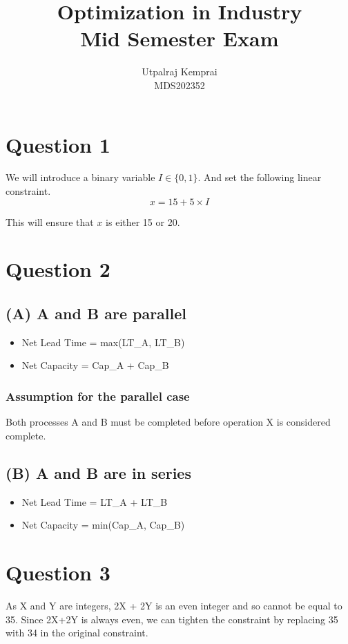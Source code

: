 \documentclass[11pt]{article}
\begin{document}
\title{Optimization in Industry \\Mid Semester Exam}
\author{Utpalraj Kemprai\\
MDS202352}
\date{}
\maketitle

\section*{Question 1}

We will introduce a binary variable \(I \in \{0,1\}\). And set the following linear constraint.
\[
    x = 15 + 5\times I
\]

This will ensure that \(x\) is either 15 or 20.

\section*{Question 2}

\subsection*{(A) A and B are parallel}
\begin{itemize}
    \item Net Lead Time = max(LT\_A, LT\_B)
    \item Net Capacity = Cap\_A + Cap\_B
\end{itemize}
\subsubsection*{Assumption for the parallel case}
Both processes A and B must be completed before operation X is considered complete.

\subsection*{(B) A and B are in series}
\begin{itemize}
    \item Net Lead Time = LT\_A + LT\_B
    \item Net Capacity = min(Cap\_A, Cap\_B)
\end{itemize}

\section*{Question 3}
As X and Y are integers, 2X + 2Y is an even integer and so cannot be equal to 35. Since 2X+2Y is always even, we can tighten the constraint by replacing 35 with 34 in the original constraint.
\end{document}
